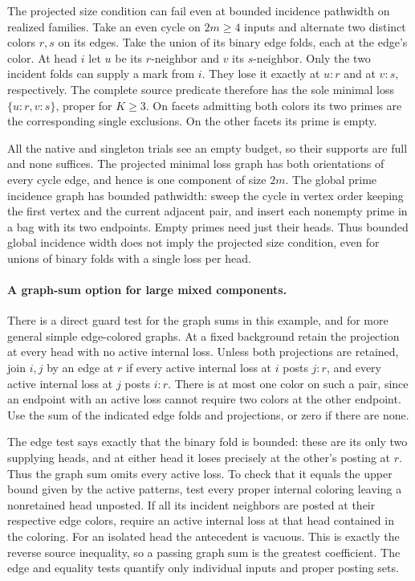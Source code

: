 The projected size condition can fail even at bounded incidence
pathwidth on realized families. Take an even cycle on $2m\ge4$
inputs and alternate two distinct colors $r,s$ on its edges.
Take the union of its binary edge folds, each at the edge's
color. At head $i$ let $u$ be its $r$-neighbor and $v$ its
$s$-neighbor. Only the two incident folds can supply a mark
from $i$. They lose it exactly at $u:r$ and at $v:s$,
respectively. The complete source predicate therefore has
the sole minimal loss $\{u:r,v:s\}$, proper for $K\ge3$.
On facets admitting both colors its two primes are the
corresponding single exclusions. On the other facets its
prime is empty.

All the native and singleton trials see an empty budget,
so their supports are full and none suffices. The projected
minimal loss graph has both orientations of every cycle
edge, and hence is one component of size $2m$. The global
prime incidence graph has bounded pathwidth: sweep the
cycle in vertex order keeping the first vertex and the
current adjacent pair, and insert each nonempty prime in
a bag with its two endpoints. Empty primes need just their
heads. Thus bounded global incidence width does not imply
the projected size condition, even for unions of binary
folds with a single loss per head.

\paragraph{A graph-sum option for large mixed components.}
There is a direct guard test for the graph sums in this
example, and for more general simple edge-colored graphs.
At a fixed background retain the projection at every head
with no active internal loss. Unless both projections are
retained, join $i,j$ by an edge at $r$ if every
active internal loss at $i$ posts $j:r$, and every active
internal loss at $j$ posts $i:r$. There is at most one
color on such a pair, since an endpoint with an active
loss cannot require two colors at the other endpoint.
Use the sum of the indicated edge folds and projections,
or zero if there are none.

The edge test says exactly that the binary fold is bounded:
these are its only two supplying heads, and at either head
it loses precisely at the other's posting at $r$. Thus
the graph sum omits every active loss. To check that it
equals the upper bound given by the active patterns, test
every proper internal coloring leaving a nonretained head unposted.
If all its incident neighbors are posted at their
respective edge colors, require an active internal loss
at that head contained in the coloring. For an isolated
head the antecedent is vacuous. This is exactly the
reverse source inequality, so a passing graph sum is
the greatest coefficient. The edge and equality tests
quantify only individual inputs and proper posting sets.

